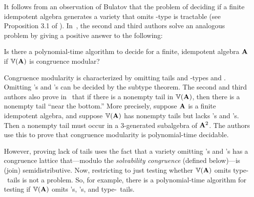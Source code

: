 

It follows from an observation of Bulatov that the problem of deciding if a finite idempotent algebra generates a variety that omits \tct-type \utyp is tractable (see Proposition 3.1 of \cite{MR2504025}).
In~\cite{Freese:2009}, the second and third authors solve an
analogous problem by giving a positive answer to the following:
\begin{prob}
  \label{prob:2}
  Is there a polynomial-time algorithm to decide for a finite,
  idempotent algebra $\mathbf{A}$ if $\operatorname{\mathbb{V}}(\mathbf{A})$ is congruence modular?
\end{prob}

Congruence modularity is characterized by omitting tails and
\tct-types \utyp and \styp.
Omitting \utyp's and \styp's can be decided by the subtype theorem.
The second and third authors also prove in~\cite{Freese:2009} that
if there is a
nonempty
tail in $\operatorname{\mathbb{V}}(\mathbf{A})$, then there is a
nonempty
tail ``near the bottom.''
More precisely, suppose $\mathbf{A}$ is a finite idempotent algebra, and suppose
$\operatorname{\mathbb{V}}(\mathbf{A})$ has nonempty tails but lacks \utyp's and \styp's.
Then a nonempty tail must occur in a 3-generated subalgebra of $\mathbf{A}^2$.
The authors use this to prove that congruence modularity is polynomial-time decidable.

However, proving lack of tails uses the fact that a variety omitting
\utyp's and \styp's has a congruence lattice that---modulo
the {\it solvability congruence} (defined below)---is (join) semidistributive.
Now, restricting to just testing whether $\operatorname{\mathbb{V}}(\mathbf{A})$ omits
type-\atyp\ tails is not a problem. So, for example, there is a
polynomial-time algorithm for testing if
$\operatorname{\mathbb{V}}(\mathbf{A})$ omits \utyp's, \styp's, and type-\atyp\ tails.

%

